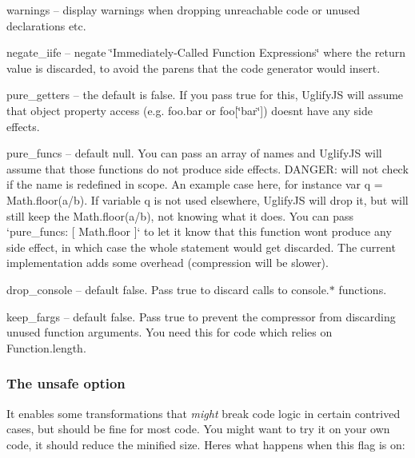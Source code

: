 \begin{DoxyItemize}
\item {\ttfamily warnings} -- display warnings when dropping unreachable code or unused declarations etc.
\item {\ttfamily negate\+\_\+iife} -- negate \char`\"{}\+Immediately-\/\+Called Function Expressions\char`\"{} where the return value is discarded, to avoid the parens that the code generator would insert.
\item {\ttfamily pure\+\_\+getters} -- the default is {\ttfamily false}. If you pass {\ttfamily true} for this, Uglify\+J\+S will assume that object property access (e.\+g. {\ttfamily foo.\+bar} or {\ttfamily foo\mbox{[}\char`\"{}bar\char`\"{}\mbox{]}}) doesn\textquotesingle{}t have any side effects.
\item {\ttfamily pure\+\_\+funcs} -- default {\ttfamily null}. You can pass an array of names and Uglify\+J\+S will assume that those functions do not produce side effects. D\+A\+N\+G\+E\+R\+: will not check if the name is redefined in scope. An example case here, for instance {\ttfamily var q = Math.\+floor(a/b)}. If variable {\ttfamily q} is not used elsewhere, Uglify\+J\+S will drop it, but will still keep the {\ttfamily Math.\+floor(a/b)}, not knowing what it does. You can pass `pure\+\_\+funcs\+: \mbox{[} \textquotesingle{}Math.\+floor\textquotesingle{} \mbox{]}` to let it know that this function won\textquotesingle{}t produce any side effect, in which case the whole statement would get discarded. The current implementation adds some overhead (compression will be slower).
\item {\ttfamily drop\+\_\+console} -- default {\ttfamily false}. Pass {\ttfamily true} to discard calls to {\ttfamily console.$\ast$} functions.
\item {\ttfamily keep\+\_\+fargs} -- default {\ttfamily false}. Pass {\ttfamily true} to prevent the compressor from discarding unused function arguments. You need this for code which relies on {\ttfamily Function.\+length}.
\end{DoxyItemize}

\subsubsection*{The {\ttfamily unsafe} option}

It enables some transformations that {\itshape might} break code logic in certain contrived cases, but should be fine for most code. You might want to try it on your own code, it should reduce the minified size. Here\textquotesingle{}s what happens when this flag is on\+:


